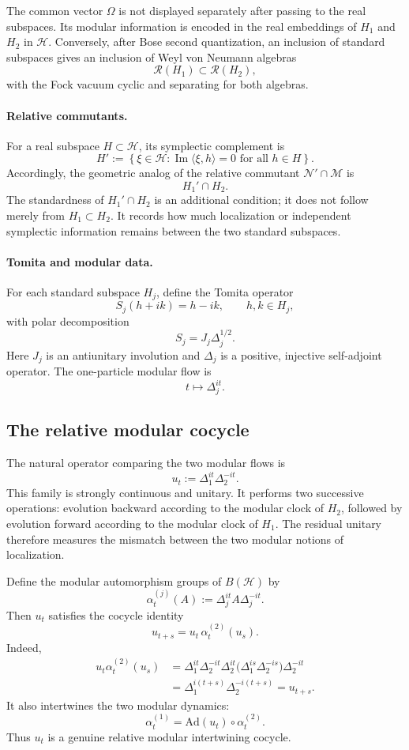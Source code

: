 \documentclass[a4paper,11pt]{article}
\theoremstyle{definition}
\newcommand{\cH}{\mathcal{H}}
\begin{document}
The common vector $\Omega$ is not displayed separately after passing to
the real subspaces.  Its modular information is encoded in the real
embeddings of $H_1$ and $H_2$ in $\cH$.  Conversely, after Bose second
quantization, an inclusion of standard subspaces gives an inclusion of
Weyl von Neumann algebras
\[
\mathcal{R}(H_1)\subset\mathcal{R}(H_2),
\]
with the Fock vacuum cyclic and separating for both algebras.

\paragraph{Relative commutants.}
For a real subspace $H\subset\cH$, its symplectic complement is
\[
H'
   :=\left\{\xi\in\cH:
      \operatorname{Im}\langle \xi,h\rangle=0
      \text{ for all }h\in H
      \right\}.
\]
Accordingly, the geometric analog of the relative commutant
$\mathcal{N}'\cap\mathcal{M}$ is
\[
\boxed{H_1'\cap H_2.}
\]
The standardness of $H_1'\cap H_2$ is an additional condition; it does
not follow merely from $H_1\subset H_2$.  It records how much localization
or independent symplectic information remains between the two standard
subspaces.

\paragraph{Tomita and modular data.}
For each standard subspace $H_j$, define the Tomita operator
\[
S_j(h+ik)=h-ik,
\qquad h,k\in H_j,
\]
with polar decomposition
\[
S_j=J_j\Delta_j^{1/2}.
\]
Here $J_j$ is an antiunitary involution and $\Delta_j$ is a positive,
injective self-adjoint operator.  The one-particle modular flow is
\[
t\longmapsto \Delta_j^{it}.
\]

\subsection*{The relative modular cocycle}

The natural operator comparing the two modular flows is
\[
\boxed{
   u_t:=\Delta_1^{it}\Delta_2^{-it}.
}
\]
This family is strongly continuous and unitary.  It performs two
successive operations: evolution backward according to the modular clock
of $H_2$, followed by evolution forward according to the modular clock of
$H_1$.  The residual unitary therefore measures the mismatch between the
two modular notions of localization.

Define the modular automorphism groups of $B(\cH)$ by
\[
\alpha_t^{(j)}(A)
   :=\Delta_j^{it}A\Delta_j^{-it}.
\]
Then $u_t$ satisfies the cocycle identity
\[
\boxed{
   u_{t+s}=u_t\,\alpha_t^{(2)}(u_s).
}
\]
Indeed,
\begin{align*}
 u_t\alpha_t^{(2)}(u_s)
 &=\Delta_1^{it}\Delta_2^{-it}
   \Delta_2^{it}
   \bigl(\Delta_1^{is}\Delta_2^{-is}\bigr)
   \Delta_2^{-it} \\
 &=\Delta_1^{i(t+s)}\Delta_2^{-i(t+s)}
 =u_{t+s}.
\end{align*}
It also intertwines the two modular dynamics:
\[
\boxed{
   \alpha_t^{(1)}
   =\text{Ad}(u_t)\circ\alpha_t^{(2)}.
}
\]
Thus $u_t$ is a genuine relative modular intertwining cocycle.
\end{document}
